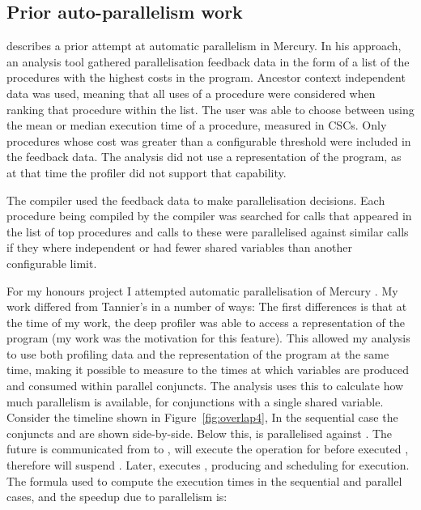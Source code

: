 \subsection{Prior auto-parallelism work}
\label{sec:backgnd_priorautopar}

\citet{tannier:2007:parallel_mercury} describes a prior attempt at automatic
parallelism in Mercury.
In his approach, 
an analysis tool gathered parallelisation feedback data in the form of
a list of the procedures with the highest costs in the program.
Ancestor context independent data was used,
meaning that all uses of a procedure were considered when ranking that
procedure within the list.
The user was able to choose between using the mean or median
execution time of a procedure, measured in CSCs.
Only procedures whose cost was greater than a configurable threshold were
included in the feedback data.
The analysis did not use a representation of the program,
as at that time the profiler did not support that capability.

The compiler used the feedback data to make parallelisation decisions.
Each procedure being compiled by the compiler was searched for calls that
appeared in the list of top procedures and calls to these were parallelised
against similar calls if they where independent or had fewer shared
variables than another configurable limit.

\label{honours_autopar}
For my honours project I attempted automatic parallelisation of Mercury
\citep{bone:2008:hons}.
My work differed from Tannier's in a number of ways:
The first differences is that at the time of my work,
the deep profiler was able to access a representation of the program
(my work was the motivation for this feature).
This allowed my analysis to use both profiling data and the representation
of the program at the same time,
making it possible to measure to the times at which variables are produced
and consumed within parallel conjuncts.
The analysis uses this to calculate how much parallelism is available,
for conjunctions with a single shared variable.
Consider the timeline shown in Figure~\ref{fig:overlap4},
In the sequential case the conjuncts  and  are shown
side-by-side.
Below this,  is parallelised against .
The future  is communicated from  to ,
 will execute the \wait operation for 
before  executed \signal, therefore \wait will suspend .
Later,  executes \signal, producing 
and scheduling  for execution.
The formula used to compute the execution times in the sequential and parallel
cases, and the speedup due to parallelism is:

